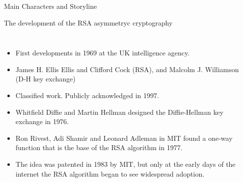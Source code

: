 \begin{frame}[t,fragile]{Main Characters and Storyline}
  \begin{block}{The development of the RSA asymmetryc cryptography}
    {\footnotesize
  \begin{columns}
      \begin{itemize}
      \item First developments in 1969 at the UK intelligence agency. 
      \item James H. Ellis Ellis and Clifford Cock (RSA), and  Malcolm J. Williamson (D-H key exchange)
      \item \alert{Classified} work. Publicly acknowledged in 1997.
      \item Whitfield Diffie and Martin Hellman designed the \alert{Diffie-Hellman key exchange} in 1976.
      \item  Ron Rivest, Adi Shamir and Leonard Adleman in MIT found a \alert{one-way function} that is the base of the RSA algorithm in 1977.
      \item The idea was patented in 1983 by MIT, but only at the early days of the internet the RSA algorithm began to see widespread adoption.
      \end{itemize}
      \begin{center}

\end{center}
\end{columns}}
\end{block}
\end{frame}
